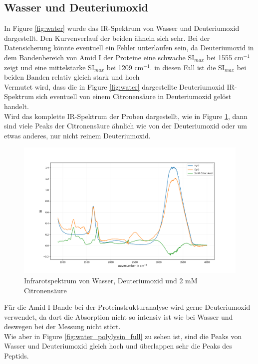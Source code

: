\documentclass[10pt,a4paper]{article}
\begin{document}
		\subsection{Wasser und Deuteriumoxid}
			In Figure \ref{fig:water} wurde das IR-Spektrum von Wasser und Deuteriumoxid dargestellt. Den Kurvenverlauf der beiden ähneln sich sehr. Bei der Datensicherung könnte eventuell ein Fehler unterlaufen sein, da Deuteriumoxid in dem Bandenbereich von Amid I der Proteine eine schwache SI$_{max}$  bei 1555 cm$^{-1}$ \cite{infrared_d2o_h2o} zeigt und eine mittelstarke SI$_{max}$  bei 1209 cm$^{-1}$\cite{infrared_d2o_h2o}. in diesen Fall ist die SI$_{max}$ bei beiden Banden relativ gleich stark und hoch\\
			Vermutet wird, dass die in Figure \ref{fig:water} dargestellte Deuteriumoxid IR-Spektrum sich eventuell von einem Citronensäure in Deuteriumoxid gelöst handelt.\\
			Wird das komplette IR-Spektrum der Proben dargestellt, wie in Figure \ref{fig:wasser_Citrat_full}, dann sind viele Peaks der Citronensäure ähnlich wie von der Deuteriumoxid oder um etwas anderes, nur nicht reinem Deuteriumoxid.\\
			
			\begin{figure}[H]
				\centering
				\includegraphics[scale=0.55]{water_citricacid.png}
				\caption{Infrarotspektrum von Wasser, Deuteriumoxid und 2 mM Citronensäure}
				\label{fig:wasser_Citrat_full}
			\end{figure}
			
			Für die Amid I Bande bei der Proteinstrukturanalyse wird gerne Deuteriumoxid verwendet, da dort die Absorption nicht so intensiv ist wie bei Wasser und deswegen bei der Messung nicht stört.\\
			Wie aber in Figure \ref{fig:water_polylysin_full} zu sehen ist, sind die Peaks von Wasser und Deuteriumoxid gleich hoch und überlappen sehr die Peaks des Peptids.
			
\end{document}
